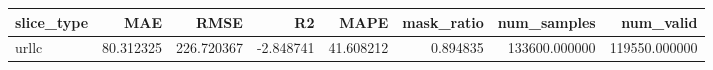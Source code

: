 \begin{tabular}{lrrrrrrr}
\toprule
slice_type & MAE & RMSE & R2 & MAPE & mask_ratio & num_samples & num_valid \\
\midrule
urllc & 80.312325 & 226.720367 & -2.848741 & 41.608212 & 0.894835 & 133600.000000 & 119550.000000 \\
\bottomrule
\end{tabular}
